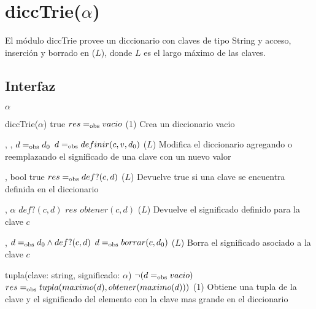 \section{diccTrie($\alpha$)}

El módulo diccTrie provee un diccionario con claves de tipo String y acceso, inserción y borrado en \bigo($L$), donde $L$ es el largo máximo de las claves.

\subsection{Interfaz}

\begin{iparamformales}{$\alpha$}

\end{iparamformales}

\iusa{}
\ioperaciones

{}
{diccTrie($\alpha$)}
{true}
{$res =_{\mathrm{obs}} vacio$}
{\bigo(1)}
{}
{Crea un diccionario vacio}

{   ,
    ,
    }
{}
{$d =_{\mathrm{obs}} d_0$}
{$d =_{\mathrm{obs}} definir(c, v, d_0)$}
{\bigo($L$)}
{}
{Modifica el diccionario agregando o reemplazando el significado de una clave 
    con un nuevo valor}

{   ,
    }
{bool}
{true}
{$res =_{\mathrm{obs}} def?(c, d)$}
{\bigo($L$)}
{}
{Devuelve true si una clave se encuentra definida en el diccionario}

{   ,
    }
{$\alpha$}
{$def?(c, d)$}
{$res$ \igobs $obtener(c, d)$}
{\bigo($L$)}
{}
{Devuelve el significado definido para la clave $c$}

{   ,
    }
{}
{$d =_{\mathrm{obs}} d_0 \land def?(c, d)$}
{$d =_{\mathrm{obs}} borrar(c, d_0)$}
{\bigo($L$)}
{}
{Borra el significado asociado a la clave $c$}

{   }
{tupla(clave: string, significado: $\alpha$)}
{$\neg (d =_{\mathrm{obs}} vacio)$}
{$res =_{\mathrm{obs}} tupla(maximo(d), obtener(maximo(d)))$}
{\bigo(1)}
{}
{Obtiene una tupla de la clave y el significado del elemento con la clave 
    mas grande en el diccionario}

